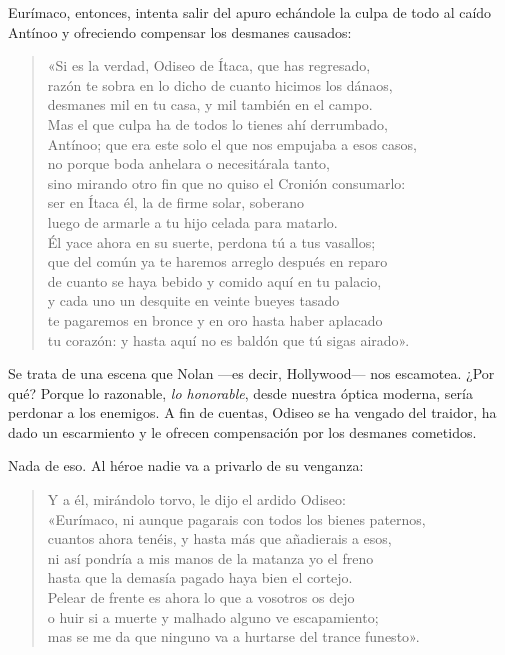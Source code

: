 Eurímaco, entonces, intenta salir del apuro echándole la culpa de todo al caído Antínoo y ofreciendo compensar los desmanes causados:

\begin{verse}
«Si es la verdad, Odiseo de Ítaca, que has regresado,\\
razón te sobra en lo dicho de cuanto hicimos los dánaos,\\
desmanes mil en tu casa, y mil también en el campo.\\
Mas el que culpa ha de todos lo tienes ahí derrumbado,\\
Antínoo; que era este solo el que nos empujaba a esos casos,\\
no porque boda anhelara o necesitárala tanto,\\
sino mirando otro fin que no quiso el Cronión consumarlo:\\
ser en Ítaca él, la de firme solar, soberano\\
luego de armarle a tu hijo celada para matarlo.\\
Él yace ahora en su suerte, perdona tú a tus vasallos;\\
que del común ya te haremos arreglo después en reparo\\
de cuanto se haya bebido y comido aquí en tu palacio,\\
y cada uno un desquite en veinte bueyes tasado\\
te pagaremos en bronce y en oro hasta haber aplacado\\
tu corazón: y hasta aquí no es baldón que tú sigas airado».
\end{verse}

Se trata de una escena que Nolan ---es decir, Hollywood--- nos escamotea. ¿Por qué? Porque lo razonable, \emph{lo honorable}, desde nuestra óptica moderna, sería perdonar a los enemigos. A fin de cuentas, Odiseo se ha vengado del traidor, ha dado un escarmiento y le ofrecen compensación por los desmanes cometidos.

Nada de eso. Al héroe nadie va a privarlo de su venganza:

\begin{verse}
Y a él, mirándolo torvo, le dijo el ardido Odiseo:\\
«Eurímaco, ni aunque pagarais con todos los bienes paternos,\\
cuantos ahora tenéis, y hasta más que añadierais a esos,\\
ni así pondría a mis manos de la matanza yo el freno\\
hasta que la demasía pagado haya bien el cortejo.\\
Pelear de frente es ahora lo que a vosotros os dejo\\
o huir si a muerte y malhado alguno ve escapamiento;\\
mas se me da que ninguno va a hurtarse del trance funesto».
\end{verse}

